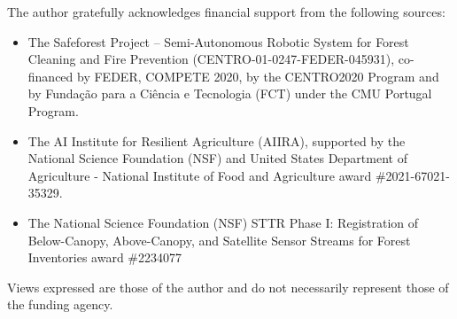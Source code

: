 
\setlength{\parskip}{1em}
\setlength{\parindent}{0em}
The author gratefully acknowledges financial support from the following sources:
\begin{itemize}
    \item The Safeforest Project – Semi-Autonomous Robotic System for Forest Cleaning and Fire Prevention (CENTRO-01-0247-FEDER-045931), co-financed by FEDER, COMPETE 2020, by the CENTRO2020 Program and by Fundação para a Ciência e Tecnologia (FCT) under the CMU Portugal Program.
    \item The AI Institute for Resilient Agriculture (AIIRA), supported by the National Science Foundation (NSF) and United States Department of Agriculture - National Institute of Food and Agriculture award \#2021-67021-35329. 
    \item The National Science Foundation (NSF) STTR Phase I: Registration of Below-Canopy, Above-Canopy, and Satellite Sensor Streams for Forest Inventories award \#2234077 
\end{itemize}
Views expressed are those of the author and do not necessarily represent those of the funding agency.
